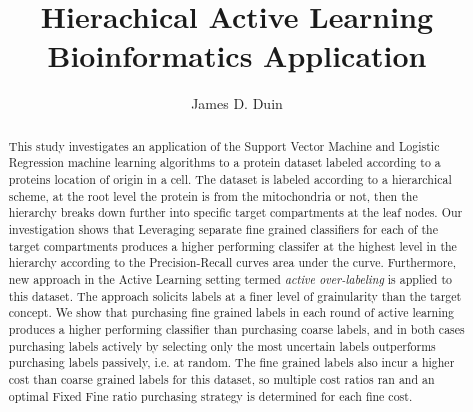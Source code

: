 \documentclass[ms]{nuthesis}
\begin{document}
\frontmatter

\title{Hierachical Active Learning Bioinformatics Application}
\author{James D. Duin}
\maketitle
\begin{abstract}
  \par This study investigates an application of the Support Vector Machine
   and Logistic Regression machine learning algorithms to a protein dataset labeled
   according to a proteins location of origin in a cell. The dataset is labeled
   according to a
    hierarchical scheme, at the root level the protein is from the mitochondria
    or not, then the hierarchy breaks down further into specific target
    compartments at the leaf nodes. Our investigation shows that Leveraging separate
    fine grained classifiers for each of the target compartments produces a higher
    performing classifer at the highest level in the hierarchy according
    to the Precision-Recall curves area under the curve. Furthermore, new approach in the
     Active Learning setting termed \textit{active over-labeling} is applied to this dataset.
    The approach solicits labels at a finer level of grainularity than the target concept.
    We show that purchasing fine grained labels in each round of active learning produces a
      higher performing classifier than purchasing coarse labels, and in both cases purchasing
      labels actively by selecting only the most uncertain labels outperforms purchasing labels
      passively, i.e. at random. The fine grained labels also incur a higher cost than coarse
      grained labels for this dataset, so multiple cost ratios ran and an optimal Fixed Fine
      ratio purchasing strategy is determined for each fine cost.
\end{abstract}
\end{document}
